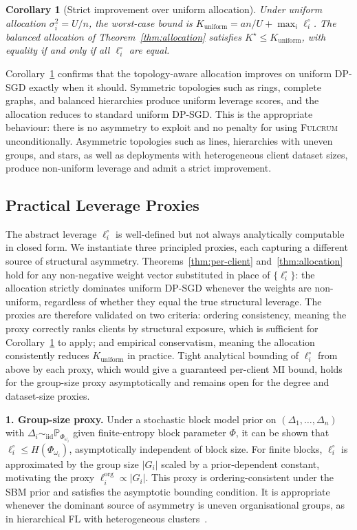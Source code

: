 \documentclass[letterpaper,journal]{IEEEtran}
\newtheorem{corollary}[theorem]{Corollary}
\newcommand{\Fulcrum}{\textsc{Fulcrum}\xspace}
\begin{document}
\begin{corollary}[Strict improvement over uniform allocation]
\label{cor:strict}
Under uniform allocation $\sigma_i^2 = U/n$, the worst-case bound
is $K_{\mathrm{uniform}} = an/U + \max_i \ell_i^\circ$. The
balanced allocation of Theorem~\ref{thm:allocation} satisfies
$K^\star \leq K_{\mathrm{uniform}}$, with equality if and only if
all $\ell_i^\circ$ are equal.
\end{corollary}

Corollary~\ref{cor:strict} confirms that the topology-aware
allocation improves on uniform DP-SGD exactly when it should.
Symmetric topologies such as rings, complete graphs, and balanced
hierarchies produce uniform leverage scores, and the allocation
reduces to standard uniform DP-SGD. This is the appropriate
behaviour: there is no asymmetry to exploit and no penalty for using
\Fulcrum unconditionally. Asymmetric topologies such as lines,
hierarchies with uneven groups, and stars, as well as deployments
with heterogeneous client dataset sizes, produce non-uniform
leverage and admit a strict improvement.

\subsection{Practical Leverage Proxies}
\label{sec:defense-proxies}

The abstract leverage $\ell_i^\circ$ is well-defined but not always
analytically computable in closed form. We instantiate three
principled proxies, each capturing a different source of structural
asymmetry. Theorems~\ref{thm:per-client} and~\ref{thm:allocation}
hold for any non-negative weight vector substituted in place of
$\{\ell_i^\circ\}$: the allocation strictly dominates uniform
DP-SGD whenever the weights are non-uniform, regardless of whether
they equal the true structural leverage. The proxies are therefore
validated on two criteria: ordering consistency, meaning the proxy
correctly ranks clients by structural exposure, which is sufficient
for Corollary~\ref{cor:strict} to apply; and empirical conservatism,
meaning the allocation consistently reduces $K_{\mathrm{uniform}}$
in practice. Tight analytical bounding of $\ell_i^\circ$ from above
by each proxy, which would give a guaranteed per-client MI bound,
holds for the group-size proxy asymptotically and remains open for
the degree and dataset-size proxies.\smallskip

\noindent\textbf{1. Group-size proxy.} Under a stochastic block model
prior on $(\Delta_1,\ldots,\Delta_n)$ with
$\Delta_i \sim_{\mathrm{iid}} \mathbb{P}_{\Phi_{\omega_i}}$ given
finite-entropy block parameter $\Phi$, it can be shown that
$\ell_i^\circ \leq H(\Phi_{\omega_i})$, asymptotically independent
of block size. For finite blocks, $\ell_i^\circ$ is approximated by
the group size $|G_i|$ scaled by a prior-dependent constant,
motivating the proxy $\ell_i^{\mathrm{org}} \propto |G_i|$. This
proxy is ordering-consistent under the SBM prior and satisfies the
asymptotic bounding condition. It is appropriate whenever the
dominant source of asymmetry is uneven organisational groups,
as in hierarchical FL with heterogeneous clusters~\cite{briggs2020hierarchical}.\smallskip
\end{document}
